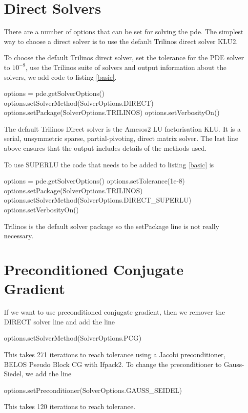 \section{Direct Solvers}
There are a number of options that can be set for solving the pde.  The simplest way to choose a direct solver is to use the default Trilinos direct solver KLU2.

To choose the default Trilinos direct solver, set the tolerance for the PDE solver to $10^{-8}$,  use the Trilinos suite of solvers and output information about the solvers, we add code to listing \ref{basic}.
\begin{python}[caption=default Direct , label=defaultdirect ]
options = pde.getSolverOptions()  
options.setSolverMethod(SolverOptions.DIRECT)         
options.setPackage(SolverOptions.TRILINOS)
options.setVerbosityOn()        
\end{python}
The default Trilinos Direct solver is the Amesos2 LU factorisation KLU. It is a serial, unsymmetric sparse, partial-pivoting, direct matrix solver.  The last line above ensures that the output includes details of the methods used.


To use SUPERLU the code that needs to be added to listing \ref{basic} is 
\begin{python}[caption=SuperLU, label=superLU ]
options = pde.getSolverOptions()  
options.setTolerance(1e-8)        
options.setPackage(SolverOptions.TRILINOS)
options.setSolverMethod(SolverOptions.DIRECT_SUPERLU)
options.setVerbosityOn()        
\end{python}
Trilinos is the default solver package so the setPackage line is not really necessary.

\section{Preconditioned Conjugate Gradient}
If we want to use preconditioned conjugate gradient, then we remover the DIRECT solver line and add the line
\begin{python}[caption=Preconditioned conjugate gradient defaults, label=PCG]
options.setSolverMethod(SolverOptions.PCG)        
\end{python}
This takes 271 iterations to reach tolerance using a Jacobi preconditioner, BELOS Pseudo Block CG with Ifpack2.  To change the preconditioner to Gauss-Siedel, we add the line
\begin{python}
options.setPreconditioner(SolverOptions.GAUSS_SEIDEL)
\end{python}
This takes 120 iterations to reach tolerance.



